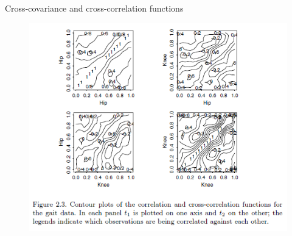 \documentclass{beamer}
\begin{document}
\begin{frame}{Cross-covariance and cross-correlation functions}
	\begin{figure}[h] %
		\begin{center}
			\includegraphics[width=0.75\linewidth]{img/3.png}
		\end{center}
		\label{fig:long}
		\label{fig:onecol}
	\end{figure}
\end{frame}
\end{document}
